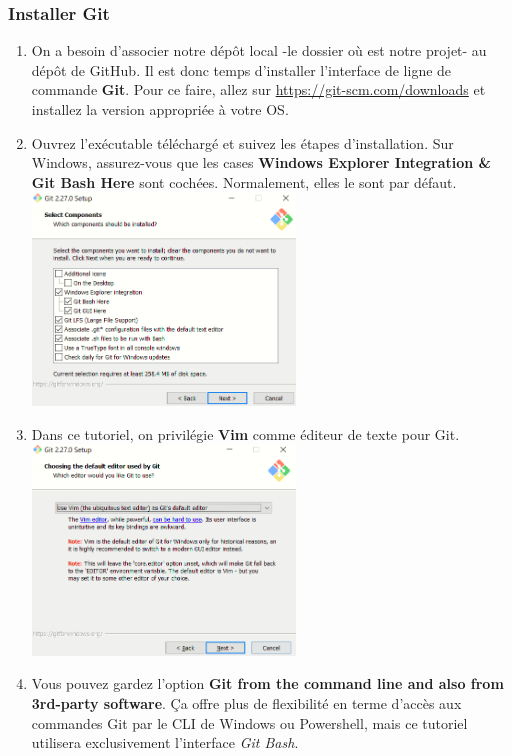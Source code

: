 \documentclass{article}
\begin{document}
\subsubsection{Installer Git}
\begin{enumerate}
  \item On a besoin d'associer notre dépôt local -le dossier où est notre projet- au dépôt de GitHub. Il est donc temps d'installer l'interface de ligne de commande \textbf{Git}. Pour ce faire, allez sur \url{https://git-scm.com/downloads} et installez la version appropriée à votre OS.
  
  \item Ouvrez l'exécutable téléchargé et suivez les étapes d'installation. Sur Windows, assurez-vous que les cases \textbf{Windows Explorer Integration \& Git Bash Here} sont cochées. Normalement, elles le sont par défaut.\\
  \includegraphics[width=0.55\textwidth, center]{WinExplorer_Integration}
  
  \item Dans ce tutoriel, on privilégie \textbf{Vim} comme éditeur de texte pour Git.\\
  \includegraphics[width=0.55\textwidth, center]{Vim_Choice}
  
  \item Vous pouvez gardez l'option \textbf{Git from the command line and also from 3rd-party software}. Ça offre plus de flexibilité en terme d'accès aux commandes Git par le CLI de Windows ou Powershell, mais ce tutoriel utilisera exclusivement l'interface \textit{Git Bash}.\\\\
  

\end{enumerate}
\end{document}
